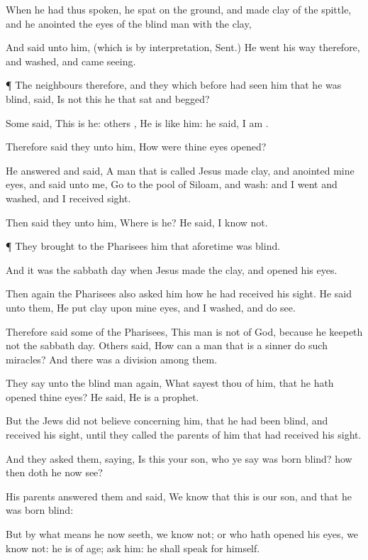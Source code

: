 {When he
had
thus
spoken, he
spat on the
ground,
and
made
clay
of the
spittle,
and he
anointed the
eyes of the blind
man with the
clay,

And
said unto
him,
{} (which is by
interpretation,
Sent.) He went his
way
therefore,
and
washed,
and
came
seeing.


\par }{\PP {}¶ The
neighbours
therefore,
and they
which
before had
seen
him
that he
was
blind,
said,
Is
not
this he that
sat
and
begged?

Some
said,
This is
he:
others
{}, He
is
like
him:
{}
he
said,
I
am
{}.

Therefore said
they unto
him,
How
were
thine
eyes
opened?

He
answered
and
said, A
man that is
called
Jesus
made
clay,
and
anointed
mine
eyes,
and
said unto
me,
Go
to the
pool of
Siloam,
and
wash:
and I
went
and
washed, and I received
sight.

Then said
they unto
him,
Where
is
he? He
said, I
know
not.


\par }{\PP {}¶ They
brought
to the
Pharisees
him
that
aforetime was
blind.

And it
was the sabbath
day
when
Jesus
made the
clay,
and
opened
his
eyes.

Then
again the
Pharisees
also
asked
him
how he had received his
sight. He
said unto
them, He
put
clay
upon
mine
eyes,
and I
washed,
and do
see.

Therefore
said
some
of the
Pharisees,
This
man
is
not
of
God,
because he
keepeth
not the sabbath
day.
Others
said,
How
can a
man that is a
sinner
do
such
miracles?
And there
was a
division
among
them.

They
say unto the blind
man
again,
What
sayest
thou
of
him,
that he hath
opened
thine
eyes? He
said, He
is a
prophet.

But the
Jews
did
not
believe
concerning
him,
that he had
been
blind,
and received his
sight,
until they
called the
parents of
him that had received his
sight.

And they
asked
them,
saying,
Is
this
your
son,
who
ye
say was
born
blind?
how
then doth
he
now
see?

His
parents
answered
them
and
said, We
know
that
this
is
our
son,
and
that he was
born
blind:

But by what
means
he
now
seeth, we
know
not;
or
who hath
opened
his
eyes,
we
know
not:
he is
of
age;
ask
him:
he shall
speak
for
himself.

}
